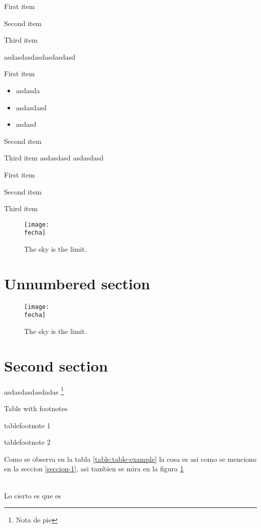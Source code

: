 \documentclass[12pt]{article}
\newcommand{\fecha}{febrero.jpg}
\begin{document}
\beginromanlist
\item First item
\item Second item 
\item Third item 
\endromanlist

asdasdasdasdasdasdasd

\beginalphlist
\item First item
    \begin{itemize}
        \item asdasda
        \item asdasdasd
        \item asdasd
    \end{itemize}
\item Second item 
\item Third item 
\endalphlist
asdasdasd asdasdasd

\beginenumeratelist
\item First item
\item Second item 
\item Third item 
\endenumeratelist

\lipsum[1]
\begin{figure}[!h]
\centering
\texttt{[image: \\fecha]}
\caption{The sky is the limit.}
\label{fig:leaf}
\end{figure}

\section*{Unnumbered section}
\lipsum[1]

\begin{figure}[!h]
\centering
\texttt{[image: \\fecha]}
\caption*{The sky is the limit.}
\end{figure}

\section{Second section}

\lipsum[1]
asdasdasdasdadas \footnote{Nota de pie}

\lipsum[1]
\begin{table}[!h]
    \caption{Table with footnotes}
  \centering
  \begin{threeparttable}[b]
  
  \small
  \begin{tablenotes}
    \item tablefootnote 1
    \item tablefootnote 2
  \end{tablenotes}
 \end{threeparttable}
 \label{table:table-example}
\end{table}

Como se observa en la tabla \ref{table:table-example} la cosa es asi como se menciono en la seccion \ref{seccion-1}, asi tambien se mira en la figura \ref{fig:leaf}

\lipsum[1]\\
\lipsum[1]
Lo cierto es que es
\frameboxend
\end{document}
